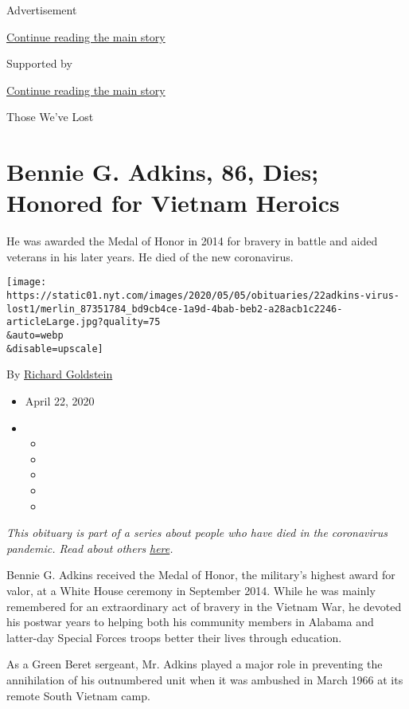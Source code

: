 Advertisement

\protect\hyperlink{after-top}{Continue reading the main story}

Supported by

\protect\hyperlink{after-sponsor}{Continue reading the main story}

Those We've Lost

\hypertarget{bennie-g-adkins-86-dies-honored-for-vietnam-heroics}{%
\section{Bennie G. Adkins, 86, Dies; Honored for Vietnam
Heroics}\label{bennie-g-adkins-86-dies-honored-for-vietnam-heroics}}

He was awarded the Medal of Honor in 2014 for bravery in battle and
aided veterans in his later years. He died of the new coronavirus.

\texttt{[image: https://static01.nyt.com/images/2020/05/05/obituaries/22adkins-virus-lost1/merlin\_87351784\_bd9cb4ce-1a9d-4bab-beb2-a28acb1c2246-articleLarge.jpg?quality=75\\\&auto=webp\\\&disable=upscale]}

By \href{https://www.nytimes.com/by/richard-goldstein}{Richard
Goldstein}

\begin{itemize}
\item
  April 22, 2020
\item
  \begin{itemize}
  \item
  \item
  \item
  \item
  \item
  \end{itemize}
\end{itemize}

\emph{This obituary is part of a series about people who have died in
the coronavirus pandemic. Read about others}
\href{https://www.nytimes.com/series/people-who-have-died-of-the-coronavirus}{\emph{here}}\emph{.}

Bennie G. Adkins received the Medal of Honor, the military's highest
award for valor, at a White House ceremony in September 2014. While he
was mainly remembered for an extraordinary act of bravery in the Vietnam
War, he devoted his postwar years to helping both his community members
in Alabama and latter-day Special Forces troops better their lives
through education.

As a Green Beret sergeant, Mr. Adkins played a major role in preventing
the annihilation of his outnumbered unit when it was ambushed in March
1966 at its remote South Vietnam camp.

